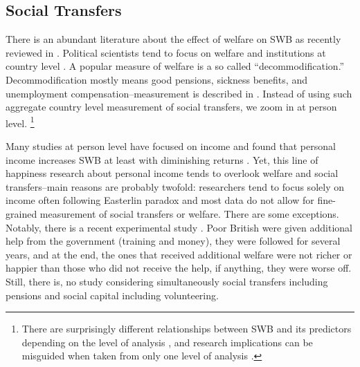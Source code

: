 \documentclass[10pt, letterpaper]{article}
\begin{document}
\begin{spacing}{1.4}
\section*{Social Transfers}

There is an abundant literature about the effect of welfare on SWB as recently
reviewed in \citet{aokJap14}. Political scientists tend to focus on welfare and institutions at country
level \citep{alvarez09,pacek08b,radcliff13,pacek08r,radcliff01,bok10}. A popular
measure of welfare is a so called ``decommodification.'' %
Decommodification mostly means good pensions, sickness benefits,
and unemployment compensation--measurement is described in
\citet{scruggs06Ba}. Instead of using such aggregate  country level measurement
of social transfers, we zoom
in at person level.%
%
\footnote{There are surprisingly different relationships between SWB and its predictors
 depending on the level of analysis \citep{ashkanasy11}, and research implications can be
misguided when taken from only one level of analysis \citep{klein00}.}

Many studies at person level have focused on income and found that 
personal  income  increases SWB at least with diminishing returns
\citep{aok_ruut_inc_ine,kahneman10,frijters04,kushlev15,dolan08al,veenhoven12}. Yet,
this line of happiness research about personal income tends to overlook welfare
and social transfers--main reasons are probably twofold: researchers tend to
focus solely on income often following Easterlin paradox \citep{easterlin10B} and most data do
not allow for fine-grained measurement of social transfers or welfare. 
%
There are some exceptions. Notably, there is a recent experimental study \citep{oswald14}. Poor British
were given additional help from the government (training and money),  
 they were followed for several years, and at the end, the ones that received
additional welfare were not richer or happier than those who did not receive the
 help, if anything, they
were worse off. Still, there is, no study considering simultaneously social transfers
including pensions and social capital including volunteering.


\end{spacing}
\end{document}
